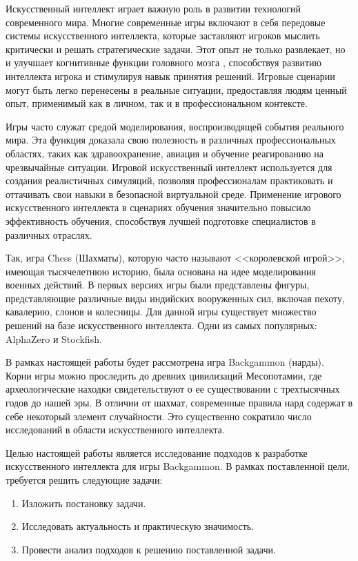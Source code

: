 Искусственный интеллект играет важную роль в развитии технологий современного мира. Многие современные игры включают в себя передовые системы искусственного интеллекта, которые заставляют игроков мыслить критически и решать стратегические задачи. Этот опыт не только развлекает, но и улучшает когнитивные функции головного мозга \cite{cognfunc}, способствуя развитию интеллекта игрока и стимулируя навык принятия решений. Игровые сценарии могут быть легко перенесены в реальные ситуации, предоставляя людям ценный опыт, применимый как в личном, так и в профессиональном контексте.

Игры часто служат средой моделирования, воспроизводящей события реального мира. Эта функция доказала свою полезность в различных профессиональных областях, таких как здравоохранение, авиация и обучение реагированию на чрезвычайные ситуации. Игровой искусственный интеллект используется для создания реалистичных симуляций, позволяя профессионалам практиковать и оттачивать свои навыки в безопасной виртуальной среде. Применение игрового искусственного интеллекта в сценариях обучения значительно повысило эффективность обучения, способствуя лучшей подготовке специалистов в различных отраслях.

Так, игра Chess (Шахматы), которую часто называют <<королевской игрой>>, имеющая тысячелетнюю историю, была основана на идее моделирования военных действий. В первых версиях игры были представлены фигуры, представляющие различные виды индийских вооруженных сил, включая пехоту, кавалерию, слонов и колесницы. Для данной игры существует множество решений на базе искусственного интеллекта. Одни из самых популярных: AlphaZero и Stockfish.

В рамках настоящей работы будет рассмотрена игра Backgammon (нарды). Корни игры можно проследить до древних цивилизаций Месопотамии, где археологические находки свидетельствуют о ее существовании с трехтысячных годов до нашей эры. В отличии от шахмат, современные правила нард содержат в себе некоторый элемент случайности. Это существенно сократило число исследований в области искусственного интеллекта.

Целью настоящей работы является исследование подходов к разработке искусственного интеллекта для игры Backgammon. В рамках поставленной цели, требуется решить следующие задачи:
\begin{enumerate}
\item Изложить постановку задачи.
\item Исследовать актуальность и практическую значимость.
\item Провести анализ подходов к решению поставленной задачи.
\end{enumerate}
